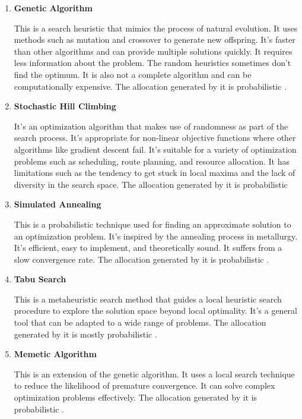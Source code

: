 \begin{enumerate}
  \item \textbf{Genetic Algorithm}

        This is a search heuristic that mimics the process of natural evolution. It uses methods such as mutation and crossover to generate new offspring. It's faster than other algorithms and can provide multiple solutions quickly. It requires less information about the problem. The random heuristics sometimes don't find the optimum. It is also not a complete algorithm and can be computationally expensive. The allocation generated by it is probabilistic \cite{lambora2019genetic}.

  \item \textbf{Stochastic Hill Climbing}

        It's an optimization algorithm that makes use of randomness as part of the search process. It's appropriate for non-linear objective functions where other algorithms like gradient descent fail. It's suitable for a variety of optimization problems such as scheduling, route planning, and resource allocation. It has limitations such as the tendency to get stuck in local maxima and the lack of diversity in the search space. The allocation generated by it is probabilistic \cite{juels1995stochastic}

  \item \textbf{Simulated Annealing}

        This is a probabilistic technique used for finding an approximate solution to an optimization problem. It's inspired by the annealing process in metallurgy. It's efficient, easy to implement, and theoretically sound. It suffers from a slow convergence rate. The allocation generated by it is probabilistic \cite{bertsimas1993simulated}.

  \item \textbf{Tabu Search}

        This is a metaheuristic search method that guides a local heuristic search procedure to explore the solution space beyond local optimality. It's a general tool that can be adapted to a wide range of problems. The allocation generated by it is mostly probabilistic \cite{glover1990tabu}.

  \item \textbf{Memetic Algorithm}

        This is an extension of the genetic algorithm. It uses a local search technique to reduce the likelihood of premature convergence. It can solve complex optimization problems effectively. The allocation generated by it is probabilistic \cite{neri2012memetic}.


\end{enumerate}
